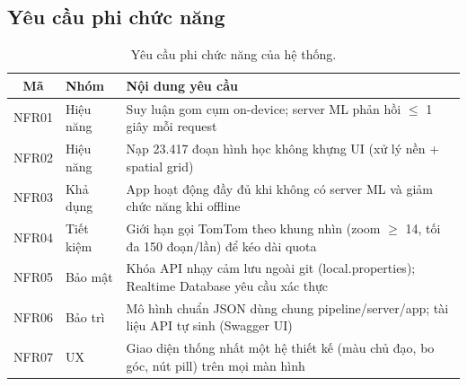 \subsection{Yêu cầu phi chức năng}
\begin{table}[h!]
\centering
\caption{Yêu cầu phi chức năng của hệ thống.}
\label{tab:nfr}
\small
\begin{tabularx}{\textwidth}{clX}
\toprule
\textbf{Mã} & \textbf{Nhóm} & \textbf{Nội dung yêu cầu}\\
\midrule
NFR01 & Hiệu năng & Suy luận gom cụm on-device; server ML phản hồi $\le$ 1 giây mỗi request\\
NFR02 & Hiệu năng & Nạp 23.417 đoạn hình học không khựng UI (xử lý nền + spatial grid)\\
NFR03 & Khả dụng & App hoạt động đầy đủ khi không có server ML và giảm chức năng khi offline\\
NFR04 & Tiết kiệm & Giới hạn gọi TomTom theo khung nhìn (zoom $\ge$ 14, tối đa 150 đoạn/lần) để kéo dài quota\\
NFR05 & Bảo mật & Khóa API nhạy cảm lưu ngoài git (local.properties); Realtime Database yêu cầu xác thực\\
NFR06 & Bảo trì & Mô hình chuẩn JSON dùng chung pipeline/server/app; tài liệu API tự sinh (Swagger UI)\\
NFR07 & UX & Giao diện thống nhất một hệ thiết kế (màu chủ đạo, bo góc, nút pill) trên mọi màn hình\\
\bottomrule
\end{tabularx}
\end{table}

